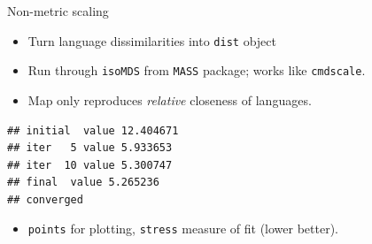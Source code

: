 \documentclass[ignorenonframetext,]{beamer}
\newenvironment{Shaded}{\begin{snugshade}}{\end{snugshade}}
\newcommand{\KeywordTok}[1]{\textcolor[rgb]{0.13,0.29,0.53}{\textbf{#1}}}
\newcommand{\NormalTok}[1]{#1}
\newcommand{\OperatorTok}[1]{\textcolor[rgb]{0.81,0.36,0.00}{\textbf{#1}}}
\newcommand{\StringTok}[1]{\textcolor[rgb]{0.31,0.60,0.02}{#1}}
\providecommand{\tightlist}{%
  \setlength{\itemsep}{0pt}\setlength{\parskip}{0pt}}
\begin{document}
\begin{frame}[fragile]{Non-metric scaling}
\protect\hypertarget{non-metric-scaling-1}{}

\begin{itemize}
\item
  Turn language dissimilarities into \texttt{dist} object
\item
  Run through \texttt{isoMDS} from \texttt{MASS} package; works like
  \texttt{cmdscale}.
\item
  Map only reproduces \emph{relative} closeness of languages.
\end{itemize}

\small

\begin{Shaded}
\end{Shaded}

\begin{verbatim}
## initial  value 12.404671 
## iter   5 value 5.933653
## iter  10 value 5.300747
## final  value 5.265236 
## converged
\end{verbatim}

\normalsize

\begin{itemize}
\tightlist
\item
  \texttt{points} for plotting, \texttt{stress} measure of fit (lower
  better).
\end{itemize}

\end{frame}
\end{document}
